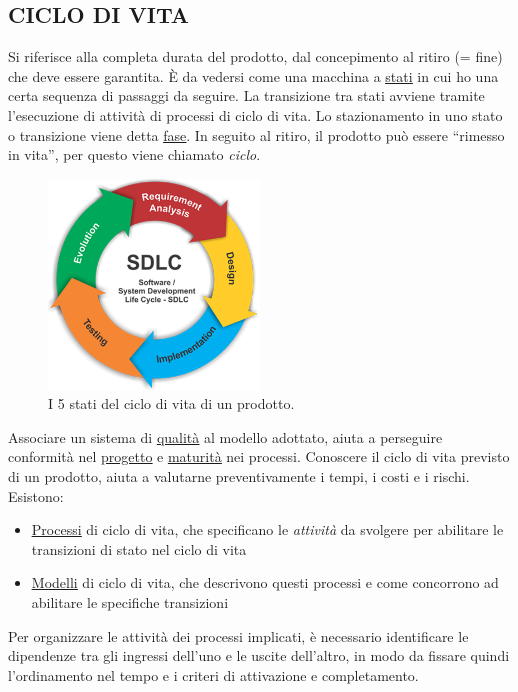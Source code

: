 		\subsection{CICLO DI VITA}  \label{ciclo}
		Si riferisce alla completa durata del prodotto, dal concepimento al ritiro (= fine) che deve essere garantita. È da vedersi come una macchina a \underline{\hyperref[stato]{stati}} in cui ho una certa sequenza di passaggi da seguire. La transizione tra stati avviene tramite l’esecuzione di
		attività di processi di ciclo di vita. Lo stazionamento in uno stato o transizione viene detta \underline{\hyperref[fase]{fase}}. In seguito al ritiro, il prodotto può essere ``rimesso in vita'', per questo viene chiamato \textit{ciclo}.

		\begin{figure}[H]
			\centering
			\includegraphics[width=0.5\textwidth]{img/lifecycle}
			\caption{I 5 stati del ciclo di vita di un prodotto.}
		\end{figure}

		Associare un sistema di \underline{\hyperref[qualita]{qualità}} al modello adottato, aiuta a perseguire conformità nel \underline{\hyperref[progetto]{progetto}} e \underline{\hyperref[maturita]{maturità}} nei processi.	Conoscere il ciclo di vita previsto di un prodotto, aiuta a valutarne preventivamente i tempi, i costi e i rischi. \\
		Esistono:
		\begin{itemize}
			\item \underline{\hyperref[processo]{Processi}} di ciclo di vita, che specificano le \textit{attività} da svolgere per abilitare le transizioni di stato nel ciclo di vita
			\item \underline{\hyperref[modelli]{Modelli}} di ciclo di vita, che descrivono questi processi e come concorrono ad abilitare le specifiche transizioni
		\end{itemize}
		Per organizzare le attività dei processi implicati, è necessario identificare le dipendenze tra gli ingressi dell'uno e le uscite dell'altro, in modo da fissare quindi l'ordinamento nel tempo e i criteri di attivazione e completamento.

